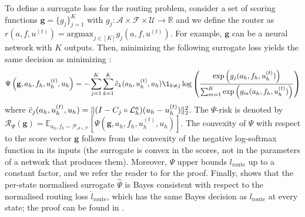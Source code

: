 \documentclass{article}
\newcommand{\edit}[1]{{\color{red}#1}}
\begin{document}
To define a surrogate loss for the routing problem, consider a set of scoring functions $\mathbf{g} =\{g_j\}_{j = 1}^K$ with $g_j: \mathcal{A} \times \mathcal{F} \times \mathcal{U} \to \mathbb{R}$ and we define the router as $r(a, f, u^{(t)}) = \text{argmax}_{j \in [K]} g_j(a, f, u^{(t)})$. For example, $\mathbf{g}$ can be a neural network with $K$ outputs. Then, minimizing the following surrogate loss yields the same decision as minimizing :
\begin{equation} \label{eq:routersurrogate}
    \Psi\left(\mathbf{g}, a_h, f_h, u^{(t)}_h, u_h\right) = -\sum_{j = 1}^K \sum_{k = 1}^K\Tilde{c}_k(a_h, u^{(t)}_h, u_h)\1_{k\neq j}\log\left(\frac{\exp\left(g_j(a_h, f_h, u^{(t)}_h)\right)}{\sum_{m = 1}^K\exp\left(g_m(a_h, f_h, u^{(t)}_h)\right)}\right)
\end{equation}
where $\Tilde{c}_j(a_h, u^{(t)}_h, u_h) = \|( I - C_{j} \circ \mathcal{L}_{h}^a)(u_h - u^{(t)}_h)\|^2_2$.
The $\Psi$-risk is denoted by $\mathcal{R}_{\Psi}(\mathbf{g}) = \mathbb{E}_{a_h, f_h \sim \mathcal{P}_{\mathcal{A} \times \mathcal{F}}}[\Psi(\mathbf{g}, a_h, f_h, u^{(t)}_h, u_h)]$. The convexity of $\Psi$ with respect to \edit{the score vector} $\mathbf{g}$ follows from the convexity of \edit{the negative} log-softmax function in its inputs \edit{(the surrogate is convex in the scores, not in the parameters of a network that produces them)}. Moreover, $\Psi$ upper bounds $l_{\text{route}}$ up to a constant factor, and we refer the reader to  for the proof. Finally,  shows that \edit{the per-state normalised surrogate $\hat\Psi$ is Bayes consistent with respect to the normalised routing loss $\hat l_{\text{route}}$, which has the same Bayes decision as $l_{\text{route}}$ at every state}; the proof can be found in .
\end{document}
